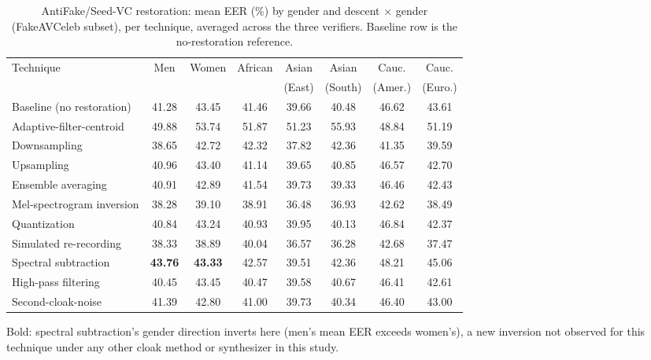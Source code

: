 \documentclass[11pt]{article}
\begin{document}
\begin{table}[H]
\centering
\caption{AntiFake/Seed-VC restoration: mean EER (\%) by gender and
descent $\times$ gender (FakeAVCeleb subset), per technique, averaged
across the three verifiers. Baseline row is the no-restoration
reference.}
\label{tab:restoration-antifake-seedvc-demo}
\begin{tabular}{lccccccc}
\toprule
Technique & Men & Women & African & Asian & Asian & Cauc. & Cauc. \\
 & & & & (East) & (South) & (Amer.) & (Euro.) \\
\midrule
Baseline (no restoration) & 41.28 & 43.45 & 41.46 & 39.66 & 40.48 & 46.62 & 43.61 \\
Adaptive-filter-centroid & 49.88 & 53.74 & 51.87 & 51.23 & 55.93 & 48.84 & 51.19 \\
Downsampling & 38.65 & 42.72 & 42.32 & 37.82 & 42.36 & 41.35 & 39.59 \\
Upsampling & 40.96 & 43.40 & 41.14 & 39.65 & 40.85 & 46.57 & 42.70 \\
Ensemble averaging & 40.91 & 42.89 & 41.54 & 39.73 & 39.33 & 46.46 & 42.43 \\
Mel-spectrogram inversion & 38.28 & 39.10 & 38.91 & 36.48 & 36.93 & 42.62 & 38.49 \\
Quantization & 40.84 & 43.24 & 40.93 & 39.95 & 40.13 & 46.84 & 42.37 \\
Simulated re-recording & 38.33 & 38.89 & 40.04 & 36.57 & 36.28 & 42.68 & 37.47 \\
Spectral subtraction & \textbf{43.76} & \textbf{43.33} & 42.57 & 39.51 & 42.36 & 48.21 & 45.06 \\
High-pass filtering & 40.45 & 43.45 & 40.47 & 39.58 & 40.67 & 46.41 & 42.61 \\
Second-cloak-noise & 41.39 & 42.80 & 41.00 & 39.73 & 40.34 & 46.40 & 43.00 \\
\bottomrule
\end{tabular}

{\small Bold: spectral subtraction's gender direction inverts here
(men's mean EER exceeds women's), a new inversion not observed for this
technique under any other cloak method or synthesizer in this study.}
\end{table}
\end{document}
